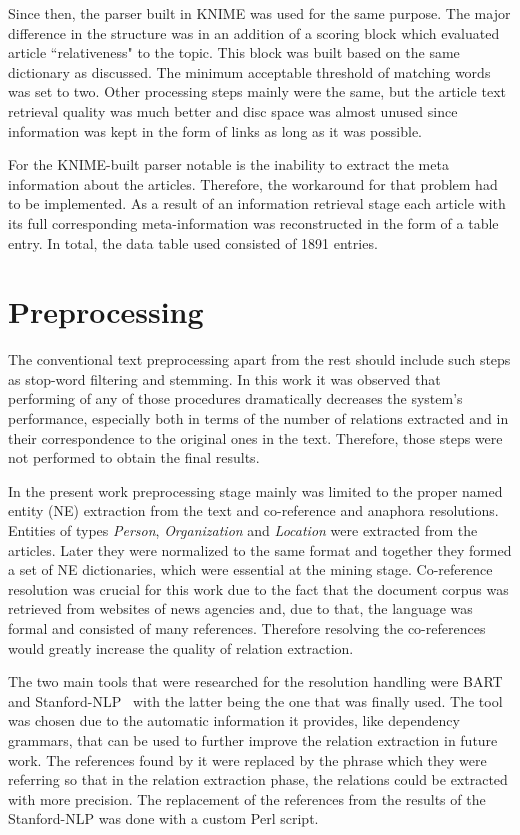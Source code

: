 \documentclass[]{article}
\begin{document}
Since then, the parser built in KNIME was used for the same purpose. The major difference in the structure was in an addition of a scoring block which evaluated article ``relativeness" to the topic. This block was built based on the same dictionary as discussed. The minimum acceptable threshold of matching words was set to two. Other processing steps mainly were the same, but the article text retrieval quality was much better and disc space was almost unused since information was kept in the form of links as long as it was possible. 

For the KNIME-built parser notable is the inability to extract the meta information about the articles. Therefore, the workaround for that problem had to be implemented. As a result of an information retrieval stage each article with its full corresponding meta-information was reconstructed in the form of a table entry. In total, the data table used consisted of 1891 entries.
%
\section{Preprocessing}
%
The conventional text preprocessing apart from the rest should include such steps as stop-word filtering and stemming. In this work it was observed that performing of any of those procedures dramatically decreases the system's performance, especially both in terms of the number of relations extracted and in their correspondence to the original ones in the text. Therefore, those steps were not performed to obtain the final results.

In the present work preprocessing stage mainly was limited to the proper named entity (NE) extraction from the text and co-reference and anaphora resolutions. Entities of types \textit{Person}, \textit{Organization} and \textit{Location} were extracted from the articles. Later they were normalized to the same format and together they formed a set of NE dictionaries, which were essential at the mining stage. Co-reference resolution was crucial for this work due to the fact that the document corpus was retrieved from websites of news agencies and, due to that, the language was formal and consisted of many references. Therefore resolving the co-references would greatly increase the quality of relation extraction. 

The two main tools that were researched for the resolution handling were BART~\cite{bart} and  Stanford-NLP~\cite{stanford} with the latter being the one that was finally used. The tool was chosen due to the automatic information it provides, like dependency grammars, that can be used to further improve the relation extraction in future work. The references found by it were replaced by the phrase which they were referring so that in the relation extraction phase, the relations could be extracted with more precision. The replacement of the references from the results of the Stanford-NLP was done with a custom Perl script.
%
\end{document}
